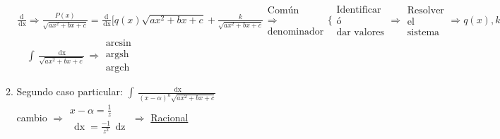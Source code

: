 \documentclass[8pt]{article}
\DeclareMathOperator{\xder}{\, \mathrm{d}x}
\DeclareMathOperator{\zder}{\, \mathrm{d}z}
\DeclareMathOperator{\argsh}{argsh}
\DeclareMathOperator{\argch}{argch}
\begin{document}
\begin{itemize}
\begin{enumerate}
							$ \frac{\mathrm{d}}{\xder} \Rightarrow 
							\frac{P(x)}{\sqrt{a x^2 + bx + c}} = 
							\frac{\mathrm{d}}{\xder}
							[q(x) \sqrt{a x^2 + bx + c} + \frac{k}{\sqrt{a x^2 + bx + c}}
							\begin{array}{c}
								\text{Común}\\
								\Rightarrow\\
								\text{denominador}
							\end{array}
							\Bigg \{
							\begin{array}{c}
								\text{Identificar}\\
								\text{ó}\\
								\text{dar valores}
							\end{array}
							\Rightarrow
							\begin{array}{c}
								\text{Resolver}\\
								\text{el}\\
								\text{sistema}
							\end{array} \Rightarrow q(x), k $
							$ \quad \int \frac{\xder}{\sqrt{a x^2 + bx + c}}
							\Rightarrow
							\begin{array}{c}
								\arcsin\\
								\argsh\\
								\argch
							\end{array} $
						\item Segundo caso particular:
							$ \int \frac{\xder}{(x - \alpha)^n \sqrt{a x^2 + bx + c}} $\\
							cambio $ \Rightarrow 
							\begin{array}{c}
								x - \alpha = \frac{1}{z}\\
								\xder = \frac{-1}{z^2} \zder
							\end{array}
							\Rightarrow $ \underline{Racional}
					\end{enumerate}
			\end{itemize}
\end{document}
